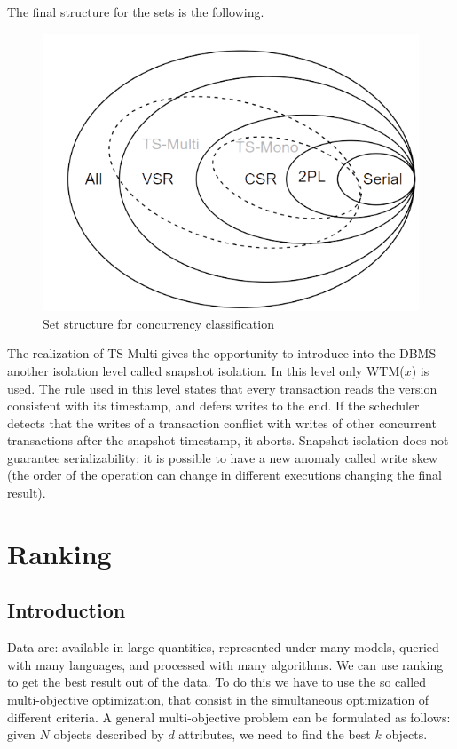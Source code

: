 \documentclass[12pt, a4paper]{report}
\newtheorem[style=M,bodystyle=\normalfont]{theorem}{Theorem}
\newtheorem[style=M,bodystyle=\normalfont]{corollary}{Corollary}
\newtheorem[style=M,bodystyle=\normalfont]{lemma}{Lemma}
\newtheorem[style=M,bodystyle=\normalfont]{definition}{Definition}
\begin{document}
    The final structure for the sets is the following. 
    \begin{figure}[H]
        \centering
        \includegraphics[width=0.75\linewidth]{images/set.png}
        \caption{Set structure for concurrency classification}
    \end{figure}
    The realization of TS-Multi gives the opportunity to introduce into the DBMS another isolation level called snapshot isolation. In this level only WTM($x$) is used. The rule 
    used in this level states that every transaction reads the version consistent with its timestamp, and defers writes to the end. If the scheduler detects that the writes of a
    transaction conflict with writes of other concurrent transactions after the snapshot timestamp, it aborts. Snapshot isolation does not guarantee serializability: it is possible 
    to have a new anomaly called write skew (the order of the operation can change in different executions changing the final result). 
    
\newpage 

\chapter{Ranking}
    \section{Introduction}
    Data are: available in large quantities, represented under many models, queried with many languages, and processed with many algorithms. We can use ranking to get the best
    result out of the data. To do this we have to use the so called multi-objective optimization, that consist in the simultaneous optimization of different criteria. A general 
    multi-objective problem can be formulated as follows: given $N$ objects described by $d$ attributes, we need to find the best $k$ objects. 
    
\end{document}

